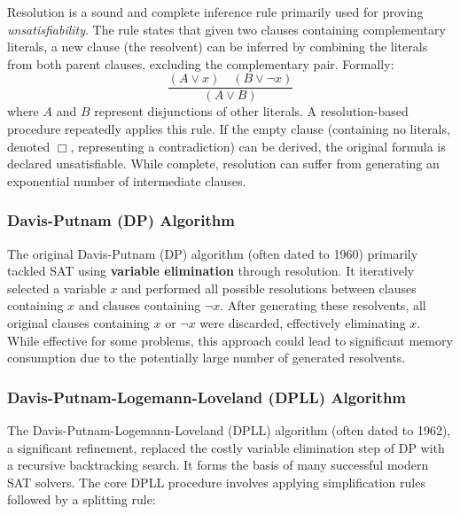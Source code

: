 \documentclass[12pt, a4paper]{article}
\begin{document}
Resolution is a sound and complete inference rule primarily used for proving \emph{unsatisfiability}. The rule states that given two clauses containing complementary literals, a new clause (the resolvent) can be inferred by combining the literals from both parent clauses, excluding the complementary pair. Formally:
\[
\frac{(A \lor x) \quad (B \lor \lnot x)}{(A \lor B)}
\]
where $A$ and $B$ represent disjunctions of other literals. A resolution-based procedure repeatedly applies this rule. If the empty clause (containing no literals, denoted $\Box$, representing a contradiction) can be derived, the original formula is declared unsatisfiable. While complete, resolution can suffer from generating an exponential number of intermediate clauses.

\subsubsection{Davis-Putnam (DP) Algorithm}
\label{subsubsec:dp}

The original Davis-Putnam (DP) algorithm (often dated to 1960) primarily tackled SAT using \textbf {variable elimination} through resolution. It iteratively selected a variable $x$ and performed all possible resolutions between clauses containing $x$ and clauses containing $\lnot x$. After generating these resolvents, all original clauses containing $x$ or $\lnot x$ were discarded, effectively eliminating $x$. While effective for some problems, this approach could lead to significant memory consumption due to the potentially large number of generated resolvents.

\subsubsection{Davis-Putnam-Logemann-Loveland (DPLL) Algorithm}
\label{subsubsec:dpll}

The Davis-Putnam-Logemann-Loveland (DPLL) algorithm (often dated to 1962), a significant refinement, replaced the costly variable elimination step of DP with a recursive backtracking search. It forms the basis of many successful modern SAT solvers. The core DPLL procedure involves applying simplification rules followed by a splitting rule:
\end{document}
